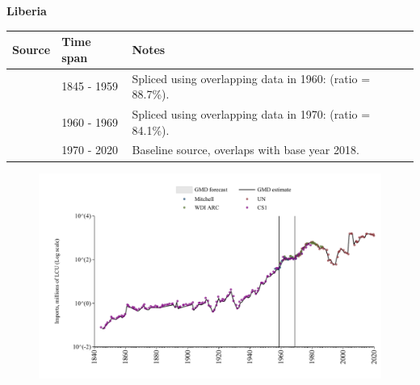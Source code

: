 \documentclass[12pt,a4paper,landscape]{article}
\begin{document}
\begin{adjustbox}{max totalsize={\paperwidth}{\paperheight},center}
\begin{minipage}[t][\textheight][t]{\textwidth}
\vspace*{0.5cm}
{}
\begin{center}
{\Large\bfseries Liberia}
\end{center}
\vspace{0.5cm}
\begin{table}[H]
\centering
\small
\begin{tabular}{|l|l|l|}
\hline
\textbf{Source} & \textbf{Time span} & \textbf{Notes} \\
\hline
\rowcolor{white}\cite{CS1_LBR}& 1845 - 1959 &Spliced using overlapping data in 1960: (ratio = 88.7\%).\\
\rowcolor{lightgray}\cite{WDI_ARC}& 1960 - 1969 &Spliced using overlapping data in 1970: (ratio = 84.1\%).\\
\rowcolor{white}\cite{UN}& 1970 - 2020 &Baseline source, overlaps with base year 2018.\\
\hline
\end{tabular}
\end{table}
\begin{figure}[H]
\centering
\includegraphics[width=\textwidth,height=0.6\textheight,keepaspectratio]{graphs/LBR_imports.pdf}
\end{figure}
\end{minipage}
\end{adjustbox}
\end{document}
